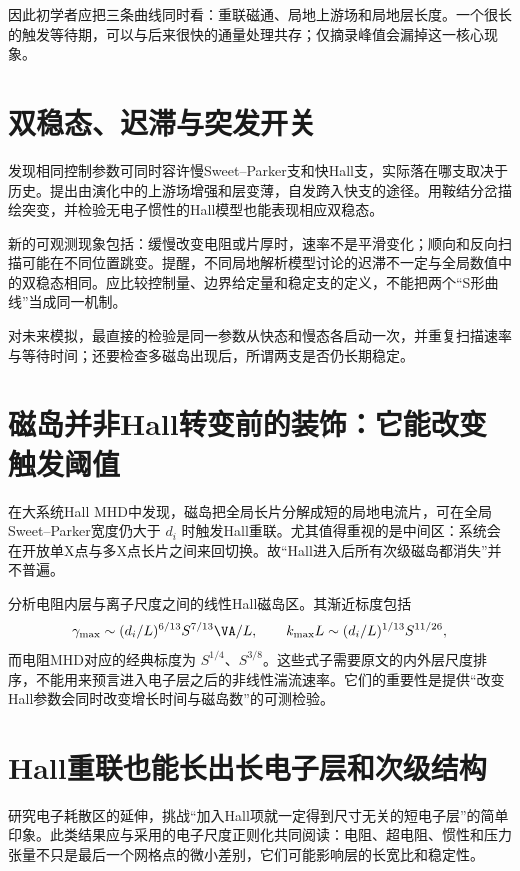 因此初学者应把三条曲线同时看：重联磁通、局地上游场和局地层长度。一个很长的触发等待期，可以与后来很快的通量处理共存；仅摘录峰值会漏掉这一核心现象。

\section{双稳态、迟滞与突发开关}
\citet{Cassak2005}发现相同控制参数可同时容许慢Sweet--Parker支和快Hall支，实际落在哪支取决于历史。\citet{Cassak2006}提出由演化中的上游场增强和层变薄，自发跨入快支的途径。\citet{Cassak2010}用鞍结分岔描绘突变，并检验无电子惯性的Hall模型也能表现相应双稳态。

新的可观测现象包括：缓慢改变电阻或片厚时，速率不是平滑变化；顺向和反向扫描可能在不同位置跳变。\citet{Sullivan2010}提醒，不同局地解析模型讨论的迟滞不一定与全局数值中的双稳态相同。应比较控制量、边界给定量和稳定支的定义，不能把两个“S形曲线”当成同一机制。

对未来模拟，最直接的检验是同一参数从快态和慢态各启动一次，并重复扫描速率与等待时间；还要检查多磁岛出现后，所谓两支是否仍长期稳定。

\section{磁岛并非Hall转变前的装饰：它能改变触发阈值}
\citet{Huang2011}在大系统Hall MHD中发现，磁岛把全局长片分解成短的局地电流片，可在全局Sweet--Parker宽度仍大于 $d_i$ 时触发Hall重联。尤其值得重视的是中间区：系统会在开放单X点与多X点长片之间来回切换。故“Hall进入后所有次级磁岛都消失”并不普遍。

\citet{Baalrud2011}分析电阻内层与离子尺度之间的线性Hall磁岛区。其渐近标度包括
\begin{equation}\gamma_{\max}\sim (d_i/L)^{6/13}S^{7/13}\VA/L,
\qquad k_{\max}L\sim(d_i/L)^{1/13}S^{11/26},
\end{equation}
而电阻MHD对应的经典标度为 $S^{1/4}$、$S^{3/8}$。这些式子需要原文的内外层尺度排序，不能用来预言进入电子层之后的非线性湍流速率。它们的重要性是提供“改变Hall参数会同时改变增长时间与磁岛数”的可测检验。

\section{Hall重联也能长出长电子层和次级结构}
\citet{Sullivan2009}研究电子耗散区的延伸，挑战“加入Hall项就一定得到尺寸无关的短电子层”的简单印象。此类结果应与采用的电子尺度正则化共同阅读：电阻、超电阻、惯性和压力张量不只是最后一个网格点的微小差别，它们可能影响层的长宽比和稳定性。

